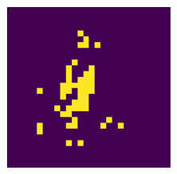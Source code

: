 \documentclass[a4paper,twocolumn]{article} %
\begin{document}
\begin{figure}[h!]
\begin{subfigure}[t]{0.19\linewidth}
    \end{subfigure}
    \hfill
    \begin{subfigure}[t]{0.19\linewidth}
        \includegraphics[width=\linewidth]{figures/reference_features_omp.png}
    \end{subfigure}

    \vspace{1em}


\end{figure}
\end{document}
